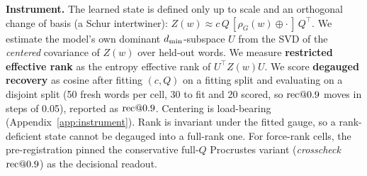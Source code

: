 \textbf{Instrument.} The learned state is defined only up to scale and an
orthogonal change of basis (a Schur intertwiner):
$Z(w) \approx c\,Q\,[\rho_G(w) \oplus \cdot\,]\,Q^{\top}$. We estimate the
model's own dominant $d_{\min}$-subspace $U$ from the SVD of the
\emph{centered} covariance of $Z(w)$ over held-out words. We measure
\textbf{restricted effective rank} as the entropy effective rank of
$U^{\top} Z(w) U$. We score \textbf{degauged recovery} as cosine after fitting
$(c, Q)$ on a fitting split and evaluating on a disjoint split (50 fresh
words per cell, 30 to fit and 20 scored, so $\mathrm{rec}@0.9$ moves in steps of
0.05), reported as $\mathrm{rec}@0.9$. Centering is load-bearing (Appendix~\ref{app:instrument}). Rank
is invariant under the fitted gauge, so a rank-deficient state cannot be
degauged into a full-rank one. For force-rank cells, the pre-registration
pinned the conservative full-$Q$ Procrustes variant (\emph{crosscheck}
$\mathrm{rec}@0.9$) as the decisional readout.
